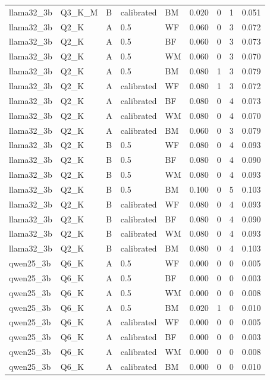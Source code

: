 \begin{tabular}{lllllrrrr}
llama32\_3b & Q3\_K\_M & B & calibrated & BM & 0.020 & 0 & 1 & 0.051 \\
llama32\_3b & Q2\_K & A & 0.5 & WF & 0.060 & 0 & 3 & 0.072 \\
llama32\_3b & Q2\_K & A & 0.5 & BF & 0.060 & 0 & 3 & 0.073 \\
llama32\_3b & Q2\_K & A & 0.5 & WM & 0.060 & 0 & 3 & 0.070 \\
llama32\_3b & Q2\_K & A & 0.5 & BM & 0.080 & 1 & 3 & 0.079 \\
llama32\_3b & Q2\_K & A & calibrated & WF & 0.080 & 1 & 3 & 0.072 \\
llama32\_3b & Q2\_K & A & calibrated & BF & 0.080 & 0 & 4 & 0.073 \\
llama32\_3b & Q2\_K & A & calibrated & WM & 0.080 & 0 & 4 & 0.070 \\
llama32\_3b & Q2\_K & A & calibrated & BM & 0.060 & 0 & 3 & 0.079 \\
llama32\_3b & Q2\_K & B & 0.5 & WF & 0.080 & 0 & 4 & 0.093 \\
llama32\_3b & Q2\_K & B & 0.5 & BF & 0.080 & 0 & 4 & 0.090 \\
llama32\_3b & Q2\_K & B & 0.5 & WM & 0.080 & 0 & 4 & 0.093 \\
llama32\_3b & Q2\_K & B & 0.5 & BM & 0.100 & 0 & 5 & 0.103 \\
llama32\_3b & Q2\_K & B & calibrated & WF & 0.080 & 0 & 4 & 0.093 \\
llama32\_3b & Q2\_K & B & calibrated & BF & 0.080 & 0 & 4 & 0.090 \\
llama32\_3b & Q2\_K & B & calibrated & WM & 0.080 & 0 & 4 & 0.093 \\
llama32\_3b & Q2\_K & B & calibrated & BM & 0.080 & 0 & 4 & 0.103 \\
qwen25\_3b & Q6\_K & A & 0.5 & WF & 0.000 & 0 & 0 & 0.005 \\
qwen25\_3b & Q6\_K & A & 0.5 & BF & 0.000 & 0 & 0 & 0.003 \\
qwen25\_3b & Q6\_K & A & 0.5 & WM & 0.000 & 0 & 0 & 0.008 \\
qwen25\_3b & Q6\_K & A & 0.5 & BM & 0.020 & 1 & 0 & 0.010 \\
qwen25\_3b & Q6\_K & A & calibrated & WF & 0.000 & 0 & 0 & 0.005 \\
qwen25\_3b & Q6\_K & A & calibrated & BF & 0.000 & 0 & 0 & 0.003 \\
qwen25\_3b & Q6\_K & A & calibrated & WM & 0.000 & 0 & 0 & 0.008 \\
qwen25\_3b & Q6\_K & A & calibrated & BM & 0.000 & 0 & 0 & 0.010 \\

\end{tabular}
